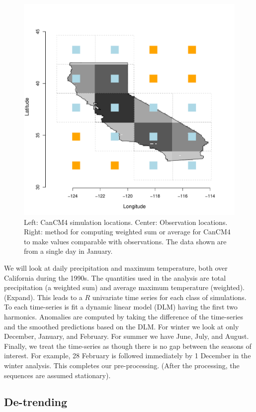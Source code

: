 \documentclass[12pt]{article}
\begin{document}
\begin{figure}
\begin{center}
\includegraphics[scale=0.26]{figs/cal_mod_box3.pdf}
\end{center}
\caption{Left: CanCM4 simulation locations. Center: Observation locations. Right: method for computing weighted sum or average for CanCM4 to make values comparable with observations. The data shown are from a single day in January.}
\end{figure}

We will look at daily precipitation and maximum temperature, both over California during the 1990s. The quantities used in the analysis are total precipitation (a weighted sum) and average maximum temperature (weighted). (Expand). This leads to a $R$ univariate time series for each class of simulations. To each time-series is fit a dynamic linear model (DLM) having the first two harmonics. Anomalies are computed by taking the difference of the time-series and the smoothed predictions based on the DLM. For winter we look at only December, January, and February. For summer we have June, July, and August. Finally, we treat the time-series as though there is no gap between the seasons of interest. For example, 28 February is followed immediately by 1 December in the winter analysis. This completes our pre-processing. (After the processing, the sequences are assumed stationary).

\subsection{De-trending}
\label{anomaly}
\end{document}
